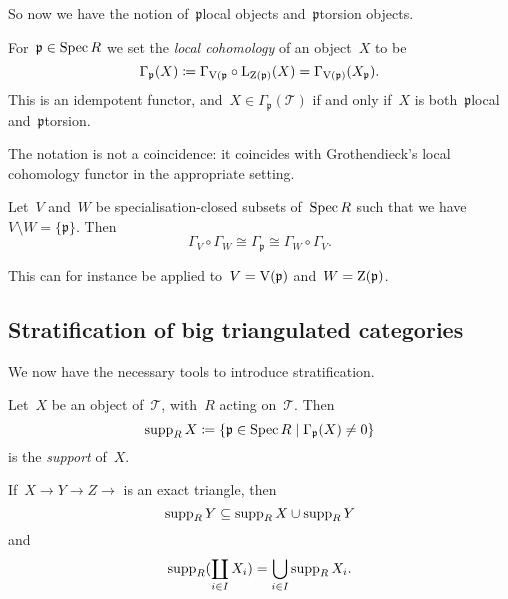 \documentclass[10pt,a4paper]{article}
\begin{document}
So now we have the notion of~$\mathfrak{p}$\dash local objects and~$\mathfrak{p}$\dash torsion objects.

\begin{definition}
  For~$\mathfrak{p}\in\operatorname{Spec} R$ we set the \emph{local cohomology} of an object~$X$ to be
  \begin{equation}
    \Gamma_{\mathfrak{p}}(X)\coloneqq\Gamma_{\operatorname{V}(\mathfrak{p}}\circ\operatorname{L}_{\operatorname{Z}(\mathfrak{p})}(X)=\Gamma_{\operatorname{V}(\mathfrak{p})}(X_{\mathfrak{p}}).
  \end{equation}
  This is an idempotent functor, and~$X\in\Gamma_{\mathfrak{p}}(\mathcal{T})$ if and only if~$X$ is both~$\mathfrak{p}$\dash local and~$\mathfrak{p}$\dash torsion.
\end{definition}

\begin{remark}
  The notation is not a coincidence: it coincides with Grothendieck's local cohomology functor in the appropriate setting.
\end{remark}

\begin{lemma}
  Let~$V$ and~$W$ be specialisation-closed subsets of~$\operatorname{Spec} R$ such that we have~$V\setminus W=\{\mathfrak{p}\}$. Then
  \begin{equation}
    \Gamma_V\circ\Gamma_W\cong\Gamma_{\mathfrak{p}}\cong\Gamma_W\circ\Gamma_V.
  \end{equation}
\end{lemma}
This can for instance be applied to~$V=\operatorname{V}(\mathfrak{p})$ and~$W=\operatorname{Z}(\mathfrak{p})$.

\subsection{Stratification of big triangulated categories}
We now have the necessary tools to introduce stratification.
\begin{definition}
  Let~$X$ be an object of~$\mathcal{T}$, with~$R$ acting on~$\mathcal{T}$. Then
  \begin{equation}
    \operatorname{supp}_R X\coloneqq\left\{ \mathfrak{p}\in\operatorname{Spec} R\mid\Gamma_{\mathfrak{p}}(X)\neq 0 \right\}
  \end{equation}
  is the \emph{support} of~$X$.
\end{definition}
\begin{remark}
  If~$X\to Y\to Z\to$ is an exact triangle, then
  \begin{equation}
    \operatorname{supp}_R Y\subseteq\operatorname{supp}_R X\cup\operatorname{supp}_R Y
  \end{equation}
  and
  \begin{equation}
    \operatorname{supp}_R(\coprod_{i\in I}X_i)=\bigcup_{i\in I}\operatorname{supp}_R X_i.
  \end{equation}
\end{remark}
\end{document}
